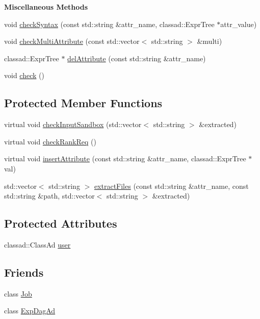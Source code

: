 \begin{Indent}{\bf Miscellaneous Methods}\par
\begin{CompactItemize}
\item 
void \hyperlink{classglite_1_1wms_1_1jdl_1_1JobAd_z9_0}{check\-Syntax} (const std::string \&attr\_\-name, classad::Expr\-Tree $\ast$attr\_\-value)
\item 
void \hyperlink{classglite_1_1wms_1_1jdl_1_1JobAd_z9_1}{check\-Multi\-Attribute} (const std::vector$<$ std::string $>$ \&multi)
\item 
classad::Expr\-Tree $\ast$ \hyperlink{classglite_1_1wms_1_1jdl_1_1JobAd_z9_2}{del\-Attribute} (const std::string \&attr\_\-name)
\item 
void \hyperlink{classglite_1_1wms_1_1jdl_1_1JobAd_z9_3}{check} ()
\end{CompactItemize}
\end{Indent}
\subsection*{Protected Member Functions}
\begin{CompactItemize}
\item 
virtual void \hyperlink{classglite_1_1wms_1_1jdl_1_1JobAd_b0}{check\-Input\-Sandbox} (std::vector$<$ std::string $>$ \&extracted)
\item 
virtual void \hyperlink{classglite_1_1wms_1_1jdl_1_1JobAd_b1}{check\-Rank\-Req} ()
\item 
virtual void \hyperlink{classglite_1_1wms_1_1jdl_1_1JobAd_b2}{insert\-Attribute} (const std::string \&attr\_\-name, classad::Expr\-Tree $\ast$val)
\item 
std::vector$<$ std::string $>$ \hyperlink{classglite_1_1wms_1_1jdl_1_1JobAd_b3}{extract\-Files} (const std::string \&attr\_\-name, const std::string \&path, std::vector$<$ std::string $>$ \&extracted)
\end{CompactItemize}
\subsection*{Protected Attributes}
\begin{CompactItemize}
\item 
classad::Class\-Ad \hyperlink{classglite_1_1wms_1_1jdl_1_1JobAd_p0}{user}
\end{CompactItemize}
\subsection*{Friends}
\begin{CompactItemize}
\item 
class \hyperlink{classglite_1_1wms_1_1jdl_1_1JobAd_n0}{Job}
\item 
class \hyperlink{classglite_1_1wms_1_1jdl_1_1JobAd_n1}{Exp\-Dag\-Ad}
\end{CompactItemize}


